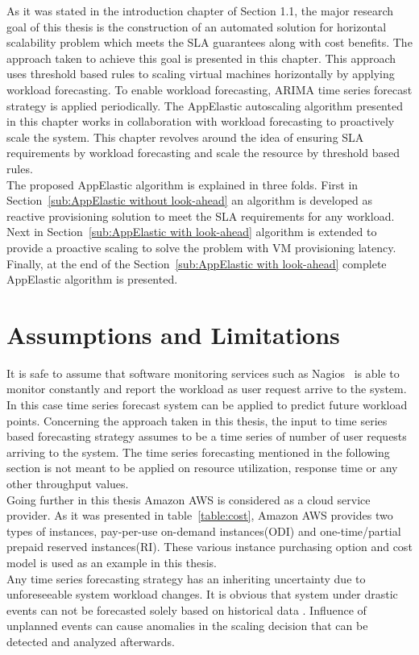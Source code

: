 As it was stated in the introduction chapter of Section 1.1, the major research goal of this thesis is the construction of an automated solution for horizontal scalability problem which meets the SLA guarantees along with cost benefits. The approach taken to achieve this goal is presented in this chapter. This approach uses threshold based rules to scaling virtual machines horizontally by applying workload forecasting. To enable workload forecasting, ARIMA time series forecast strategy is applied periodically. The AppElastic autoscaling algorithm presented in this chapter works in collaboration with workload forecasting to proactively scale the system. This chapter revolves around the idea of ensuring SLA requirements by workload forecasting and scale the resource by threshold based rules.
\\
The proposed AppElastic algorithm is explained in three folds. First in Section~\ref{sub:AppElastic without look-ahead} an algorithm is developed as reactive provisioning solution to meet the SLA requirements for any workload. Next in Section~\ref{sub:AppElastic with look-ahead} algorithm is extended to provide a proactive scaling to solve the problem with VM provisioning latency. Finally, at the end of the Section~\ref{sub:AppElastic with look-ahead} complete AppElastic algorithm is presented.
\section{Assumptions and Limitations}
\label{sec:Assumptions and Limitations}
It is safe to assume that software monitoring services  such as Nagios~\cite{josephsen2007building} is able to monitor constantly and report the workload as user request arrive to the system. In this case time series forecast system can be applied to predict future workload points. Concerning the approach taken in this thesis, the input to time series based forecasting strategy assumes to be a time series of number of user requests arriving to the system. The time series forecasting mentioned in the following section is not meant to be applied on resource utilization, response time or any other throughput values.
\\
Going further in this thesis Amazon AWS is considered as a cloud service provider. As it was presented in table~\ref{table:cost}, Amazon AWS provides two types of instances, pay-per-use on-demand instances(ODI) and one-time/partial prepaid reserved instances(RI). These various instance purchasing option and cost model is used as an example in this thesis.
\\
Any time series forecasting strategy has an inheriting uncertainty due to unforeseeable system workload changes. It is obvious that system under drastic events can not be forecasted solely based on historical data \cite{herbst2012workload}. Influence of unplanned events can cause anomalies in the scaling decision that can be detected and analyzed afterwards.

